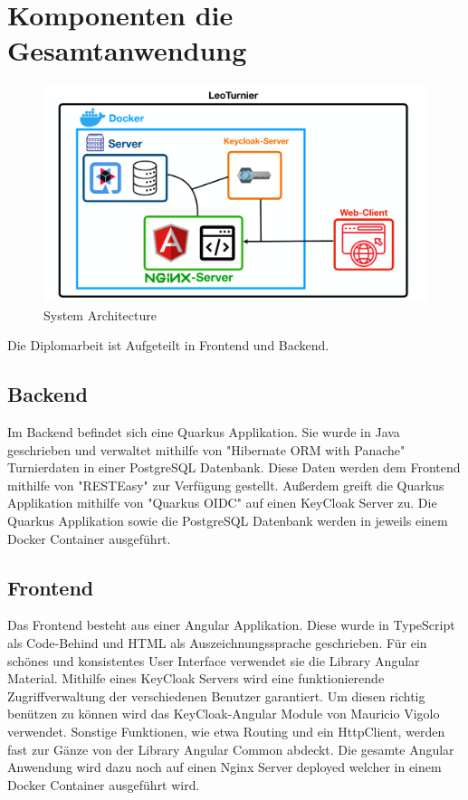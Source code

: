 \section{Komponenten die Gesamtanwendung}

\begin{figure}[H]
    \includegraphics[scale=0.30]{pics/system_architecture_2.png}
    \caption{System Architecture}
\end{figure}

Die Diplomarbeit ist Aufgeteilt in Frontend und Backend. 

\subsection{Backend}

Im Backend befindet sich eine Quarkus Applikation. Sie wurde in Java geschrieben und verwaltet mithilfe von "Hibernate ORM with Panache" Turnierdaten in einer PostgreSQL Datenbank.
Diese Daten werden dem Frontend mithilfe von "RESTEasy" zur Verfügung gestellt. Außerdem greift die Quarkus Applikation mithilfe von "Quarkus OIDC" auf einen KeyCloak Server zu. 
Die Quarkus Applikation sowie die PostgreSQL Datenbank werden in jeweils einem Docker Container ausgeführt.

\subsection{Frontend}

Das Frontend besteht aus einer Angular Applikation. Diese wurde in TypeScript als Code-Behind und HTML als Auszeichnungssprache geschrieben. Für ein schönes und konsistentes User Interface
verwendet sie die Library Angular Material. Mithilfe eines KeyCloak Servers wird eine funktionierende Zugriffverwaltung der verschiedenen Benutzer garantiert.
Um diesen richtig benützen zu können wird das KeyCloak-Angular Module von Mauricio Vigolo \cite{sysarch-keycloak-angular-1} verwendet. Sonstige Funktionen, wie etwa Routing und ein HttpClient, werden fast zur Gänze von der Library
Angular Common abdeckt.
Die gesamte Angular Anwendung wird dazu noch auf einen Nginx Server deployed welcher in einem Docker Container ausgeführt wird. 


